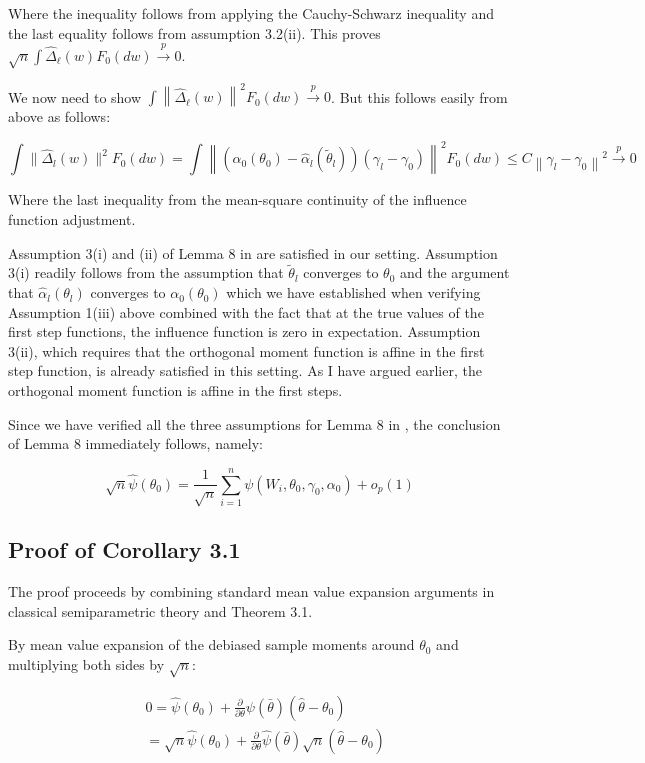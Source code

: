 Where the inequality follows from applying the Cauchy-Schwarz inequality and the last equality follows from assumption 3.2(ii). This proves $\sqrt{n} \int \hat{\Delta}_{\ell}(w) F_0(d w) \xrightarrow{p} 0$.

We now need to show  $\int\left\|\hat{\Delta}_{\ell}(w)\right\|^2 F_0(d w) \xrightarrow{p} 0$. But this follows easily from  above as follows: 

\[
\int \|\hat{\Delta}_l(w)\|^2 F_0(d w)=\int\left\|\left(\alpha_0\left(\theta_0\right)-\hat{\alpha}_l\left(\tilde{\theta}_l\right)\right)\left(\gamma_l-\gamma_0\right)\right\|^2 F_0 (dw) \leq C\left\|\gamma_l-\gamma_0\right\|^2 \xrightarrow{p} 0
\]

Where the last inequality from the mean-square continuity of the influence function adjustment.

Assumption 3(i) and (ii) of Lemma 8 in \citet{chernozhukov2022locally} are satisfied in our setting. Assumption 3(i) readily follows from the assumption that $\tilde{\theta}_l$ converges to $\theta_0$ and the argument that $\hat{\alpha}_l (\theta_l)$ converges to $\alpha_0(\theta_0)$ which we have established when verifying Assumption 1(iii) above combined with the fact that at the true values of the first step functions, the influence function is zero in expectation. Assumption 3(ii), which requires that the orthogonal moment function is affine in the first step function, is already satisfied in this setting. As I have argued earlier, the orthogonal moment function is affine in the first steps.

Since we have verified all the three assumptions for Lemma 8 in \citet{chernozhukov2022locally}, the conclusion of Lemma 8 immediately follows, namely:

\[\sqrt{n} \hat{\psi}\left(\theta_0\right)=\frac{1}{\sqrt{n}} \sum_{i=1}^n \psi\left(W_i, \theta_0, \gamma_0, \alpha_0\right)+o_p(1) \]

\subsection{Proof of Corollary 3.1}
The proof proceeds by combining standard mean value expansion arguments in classical semiparametric theory and Theorem 3.1. 

By mean value expansion of the debiased sample moments around $\theta_0$ and multiplying both sides by $\sqrt{n}$:

\begin{align*}
&0=\hat{\psi}\left(\theta_0\right)+\frac{\partial}{\partial{\theta}}{\psi(\bar{\theta})(\hat{\theta}-\theta_0)} \\
&=\sqrt{n}\hat{\psi}\left(\theta_0\right)+\frac{\partial}{\partial{\theta}}{\hat{\psi}(\bar{\theta})\sqrt{n}(\hat{\theta}-\theta_0)}
\end{align*}


